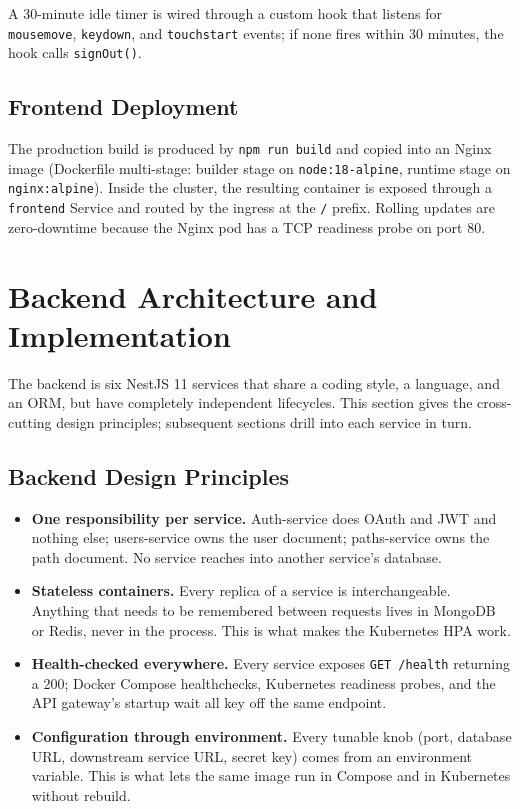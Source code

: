 \documentclass[11pt,a4paper]{article}
\begin{document}
A 30-minute idle timer is wired through a custom hook that listens
for \texttt{mousemove}, \texttt{keydown}, and \texttt{touchstart}
events; if none fires within 30 minutes, the hook calls
\texttt{signOut()}.

\subsection{Frontend Deployment}
The production build is produced by \texttt{npm run build} and copied
into an Nginx image (Dockerfile multi-stage: builder stage on
\texttt{node:18-alpine}, runtime stage on \texttt{nginx:alpine}).
Inside the cluster, the resulting container is exposed through a
\texttt{frontend} Service and routed by the ingress at the \texttt{/}
prefix.  Rolling updates are zero-downtime because the Nginx pod has
a TCP readiness probe on port 80.

\section{Backend Architecture and Implementation}

The backend is six NestJS 11 services that share a coding style, a
language, and an ORM, but have completely independent lifecycles.
This section gives the cross-cutting design principles; subsequent
sections drill into each service in turn.

\subsection{Backend Design Principles}
\begin{itemize}[leftmargin=*]
  \item \textbf{One responsibility per service.}  Auth-service does
        OAuth and JWT and nothing else; users-service owns the user
        document; paths-service owns the path document.  No service
        reaches into another service's database.
  \item \textbf{Stateless containers.}  Every replica of a service is
        interchangeable.  Anything that needs to be remembered between
        requests lives in MongoDB or Redis, never in the process.
        This is what makes the Kubernetes HPA work.
  \item \textbf{Health-checked everywhere.}  Every service exposes
        \texttt{GET /health} returning a 200; Docker Compose
        healthchecks, Kubernetes readiness probes, and the API
        gateway's startup wait all key off the same endpoint.
  \item \textbf{Configuration through environment.}  Every tunable
        knob (port, database URL, downstream service URL, secret key)
        comes from an environment variable.  This is what lets the
        same image run in Compose and in Kubernetes without rebuild.
\end{itemize}
\end{document}
